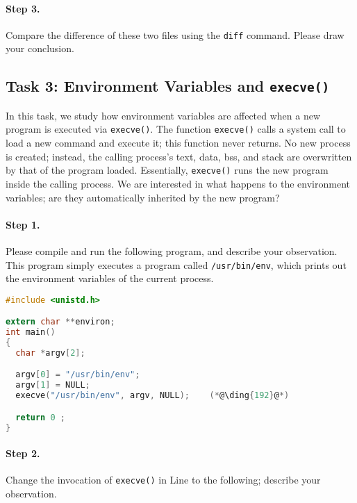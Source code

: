 \paragraph{Step 3.} Compare the difference of these two files using
the {\tt diff} command. Please draw your conclusion.



\subsection{Task 3: Environment Variables and {\tt execve()}}

In this task, we study how environment variables are affected
when a new program is
executed via {\tt execve()}. The
function {\tt execve()} calls a system call to load
a new command and execute it; this function never returns.
No new process is created; instead, the calling
process's text,  data, bss, and stack  are overwritten by that of
the program loaded. Essentially, {\tt execve()} runs the new program inside
the calling process. We are interested in what happens to the
environment variables; are they automatically inherited by the
new program?


\paragraph{Step 1.} Please compile and run the following
program, and describe your observation. This program simply executes
a program called \texttt{/usr/bin/env}, which prints out the environment
variables of the current process.

\begin{lstlisting}[language=C, caption=\texttt{myenv.c}]
#include <unistd.h>

extern char **environ;
int main()
{
  char *argv[2];

  argv[0] = "/usr/bin/env";
  argv[1] = NULL;
  execve("/usr/bin/env", argv, NULL);    (*@\ding{192}@*)

  return 0 ;
}
\end{lstlisting}


\paragraph{Step 2.} Change the invocation of {\tt execve()}
in Line  to the following; describe your observation.


